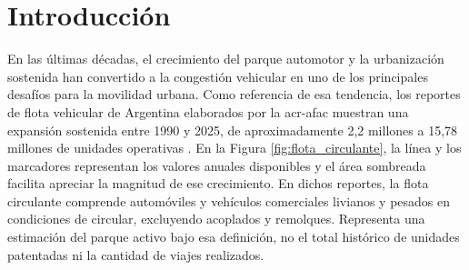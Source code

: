 \chapter{Introducción}\label{introduccion}

En las últimas décadas, el crecimiento del parque automotor y la urbanización sostenida han convertido a la congestión vehicular en uno de los principales desafíos para la movilidad urbana. Como referencia de esa tendencia, los reportes de flota vehicular de Argentina elaborados por la \gls{acr-afac} muestran una expansión sostenida entre 1990 y 2025, de aproximadamente 2,2 millones a 15,78 millones de unidades operativas \cite{AFAC2018Flota,AFAC2026Flota}. En la Figura \ref{fig:flota_circulante}, la línea y los marcadores representan los valores anuales disponibles y el área sombreada facilita apreciar la magnitud de ese crecimiento. En dichos reportes, la flota circulante comprende automóviles y vehículos comerciales livianos y pesados en condiciones de circular, excluyendo acoplados y remolques. Representa una estimación del parque activo bajo esa definición, no el total histórico de unidades patentadas ni la cantidad de viajes realizados.

